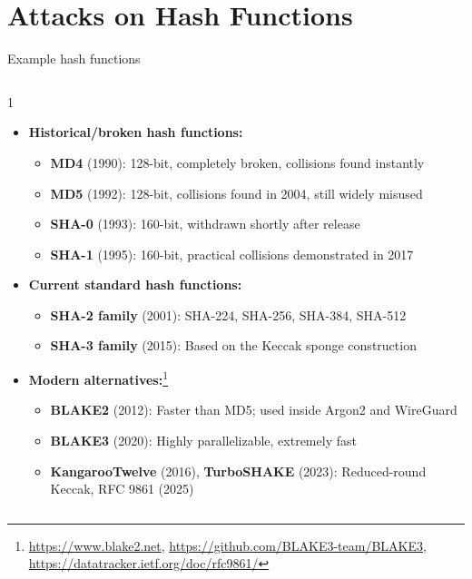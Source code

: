 \ifdefined\PRESENTATION\else\PassOptionsToClass{handout}{beamer}\fi\documentclass[aspectratio=169, lualatex]{beamer}
\begin{document}
\section{Attacks on Hash Functions}

\begin{frame}{Example hash functions}
	\vspace{-0.4cm}
	\begin{columns}[c]
		\begin{column}{1\textwidth}
			\begin{itemize}[<+->]
				\item \textbf{Historical/broken hash functions:}
				      \begin{itemize}
					      \item \textbf{MD4} (1990): 128-bit, completely broken, collisions found instantly
					      \item \textbf{MD5} (1992): 128-bit, collisions found in 2004, still widely misused
					      \item \textbf{SHA-0} (1993): 160-bit, withdrawn shortly after release
					      \item \textbf{SHA-1} (1995): 160-bit, practical collisions demonstrated in 2017
				      \end{itemize}
				\item \textbf{Current standard hash functions:}
				      \begin{itemize}
					      \item \textbf{SHA-2 family} (2001): SHA-224, SHA-256, SHA-384, SHA-512
					      \item \textbf{SHA-3 family} (2015): Based on the Keccak sponge construction
				      \end{itemize}
				\item \textbf{Modern alternatives:}\footnote{\url{https://www.blake2.net}, \url{https://github.com/BLAKE3-team/BLAKE3}, \url{https://datatracker.ietf.org/doc/rfc9861/}}
				      \begin{itemize}
					      \item \textbf{BLAKE2} (2012): Faster than MD5; used inside Argon2 and WireGuard
					      \item \textbf{BLAKE3} (2020): Highly parallelizable, extremely fast
					      \item \textbf{KangarooTwelve} (2016), \textbf{TurboSHAKE} (2023): Reduced-round Keccak, RFC 9861 (2025)
				      \end{itemize}
			\end{itemize}
		\end{column}
	\end{columns}
\end{frame}
\end{document}
